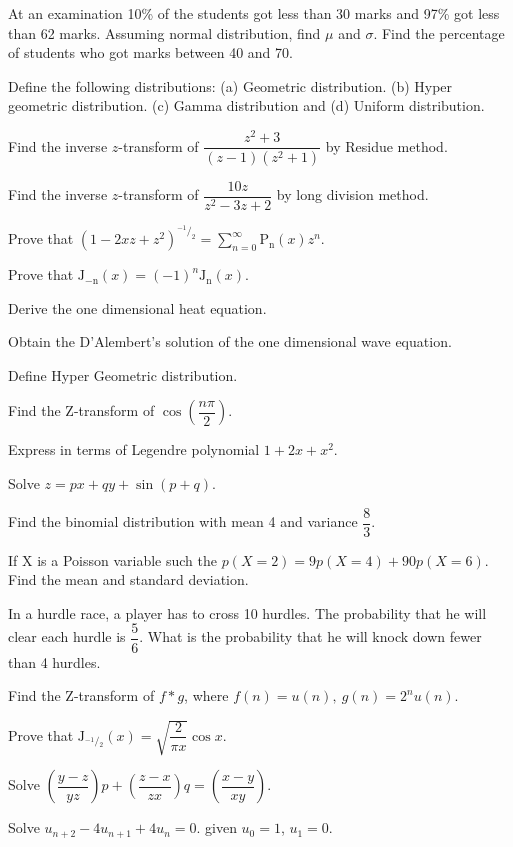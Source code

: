 \markB

\newpage \again

\partC

\item At an examination 10\% of the students got less than 30 marks and 97\%
  got less than 62 marks. Assuming normal distribution, find $\mu$ and $\sigma$.
  Find the percentage of students who got marks between 40 and 70.
\Or
\item Define the following distributions: (a) Geometric distribution. (b) Hyper
  geometric distribution. (c) Gamma distribution and (d) Uniform distribution.

\item Find the inverse $z$-transform of $\dfrac{z^2 + 3}{(z-1)(z^2+1)}$ by Residue
  method.
\Or
\item Find the inverse $z$-transform of $\dfrac{10z}{z^2 - 3z +2}$ by long
  division method.

\item Prove that $(1 - 2xz + z^2)^{^{-1}\!/_2} = \sum\limits_{n=0}^{\infty}
  \text{P}_\text{n}(x)z^n$.
\Or
\item Prove that $\text{J}_{-\text{n}}(x) = (-1)^n \text{J}_\text{n}(x).$

\item Derive the one dimensional heat equation.
\Or
\item Obtain the D'Alembert's solution of the one dimensional wave equation.

\markC
\ene

\newpage

\sub {\subj}
\maxtime

\partA

\iitem Define Hyper Geometric distribution.
\item Find the Z-transform of $\cos\left(\dfrac{n\pi}{2}\right)$.
\item Express in terms of Legendre polynomial $ 1 + 2x + x^2$.
\item Solve $ z = px + qy + \sin(p+q)$.
\item Find the binomial distribution with mean 4 and variance $\dfrac{8}{3}$.

\markA
\partB

\item If X is a Poisson variable such the $ p(X=2) = 9p (X=4) + 90p(X=6)$. Find the mean and
  standard deviation.
\item In a hurdle race, a player has to cross 10 hurdles. The probability that he will clear
  each hurdle is $\dfrac{5}{6}$. What is the probability that he will knock down fewer than
  4 hurdles.
\item Find the Z-transform of $f*g$, where $f(n) = u(n),\ g(n) = 2^nu(n)$.
\item Prove that $\text{J}_{{^{-1}}\!/{_2}}(x) = \sqrt{\dfrac{2}{\pi x}}\cos x.$
\item Solve $\left(\dfrac{y-z}{yz}\right)p + \left(\dfrac{z-x}{zx}\right)q = \left(\dfrac{x-y}{xy}\right)$.
\item Solve $u_{n+2} - 4u_{n+1} + 4u_{n} = 0$. given $u_0 = 1$, $ u_1 = 0$.

